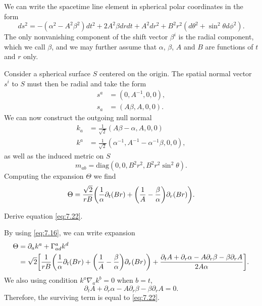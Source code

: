 We can write the spacetime line element in spherical polar coordinates in the form
\begin{equation}
	ds^2 = - (\alpha^2 - A^2 \beta^2) dt^2 + 2A^2 \beta drdt + A^2 dr^2 + B^2r^2 (d\theta^2 + \sin^2 \theta d\phi^2).
\end{equation}
The only nonvanishing component of the shift vector $\beta^i$ is the radial component, which we call $\beta$, and we may further assume that $\alpha$, $\beta$, $A$ and $B$ are functions of $t$ and $r$ only.

Consider a spherical surface $S$ centered on the origin. The spatial normal vector $s^i$ to $S$ must then be radial and take the form
\begin{align}
	s^a &= (0, A^{-1}, 0, 0),\\
s_a &= (A\beta , A, 0, 0).
\end{align}
We can now construct the outgoing null normal
\begin{align}
	k_a &= \frac{1}{\sqrt{2}}(A\beta - \alpha, A, 0, 0)\\
	k^a &= \frac{1}{\sqrt{2}}(\alpha^{-1}, A^{-1} - \alpha^{-1}\beta, 0, 0),
\end{align}
as well as the induced metric on $S$
\begin{equation}
	m_{ab} = \mathrm{diag}(0, 0, B^2r^2, B^2r^2\sin^2 \theta).
\end{equation}
Computing the expansion $\Theta$ we find
\begin{equation}
	\label{eq:7.22}
	\Theta = \frac{\sqrt{2}}{rB}\qty(\frac{1}{\alpha}\partial_t(Br) + \qty(\frac{1}{A} - \frac{\beta}{\alpha})\partial_r(Br)).
\end{equation}

\begin{exercise}
Derive equation \eqref{eq:7.22}.

By using \eqref{eq:7.16}, we can write expansion
\begin{align}
	\Theta &= \partial_a k^a + \Gamma^a_{ad}k^d\\
	&= \sqrt{2}\qty[\frac{1}{rB}\qty(\frac{1}{\alpha}\partial_t(Br) + \qty(\frac{1}{A} - \frac{\beta}{\alpha})\partial_r(Br)) + \frac{\partial_t A + \partial_r \alpha - A\partial_r \beta - \beta \partial_r A}{2A\alpha}].
\end{align}
We also using condition $k^a\nabla_ak^b=0$ when $b=t$,
\begin{equation}
	\partial_t A + \partial_r \alpha - A\partial_r \beta - \beta \partial_r A = 0.
\end{equation}
Therefore, the surviving term is equal to \eqref{eq:7.22}.

\end{exercise}


